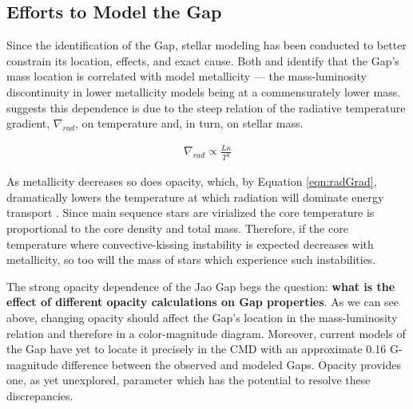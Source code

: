\subsection{Efforts to Model the Gap}
Since the identification of the Gap, stellar modeling has been
conducted to better constrain its location, effects, and exact cause.
Both \citet{Mansfield2021} and \citet{Feiden2021} identify that the Gap's mass
location is correlated with model metallicity --- the mass-luminosity
discontinuity in lower metallicity models being at a commensurately lower mass.
\citet{Feiden2021} suggests this dependence is due to the steep relation of
the radiative temperature gradient, $\nabla_{rad}$, on temperature and, in turn,
on stellar mass.

\begin{align}\label{eqn:radGrad}
	\nabla_{rad} \propto \frac{L\kappa}{T^{4}}
\end{align}

As metallicity decreases so does opacity, which, by Equation \ref{eqn:radGrad},
dramatically lowers the temperature at which radiation will dominate energy
transport \citep{Chabrier1997}. Since main sequence stars are virialized the
core temperature is proportional to the core density and total mass. Therefore,
if the core temperature where convective-kissing instability is expected
decreases with metallicity, so too will the mass of stars which experience such
instabilities.


The strong opacity dependence of the Jao Gap begs the question: \textbf{what is
the effect of different opacity calculations on Gap properties}.
As we can see above, changing opacity should affect the Gap's location in the
mass-luminosity relation and therefore in a color-magnitude diagram. Moreover,
current models of the Gap have yet to locate it precisely in the CMD
\citep{Feiden2021} with an approximate 0.16 G-magnitude difference between the
observed and modeled Gaps. Opacity provides one, as yet unexplored, parameter
which has the potential to resolve these discrepancies.
